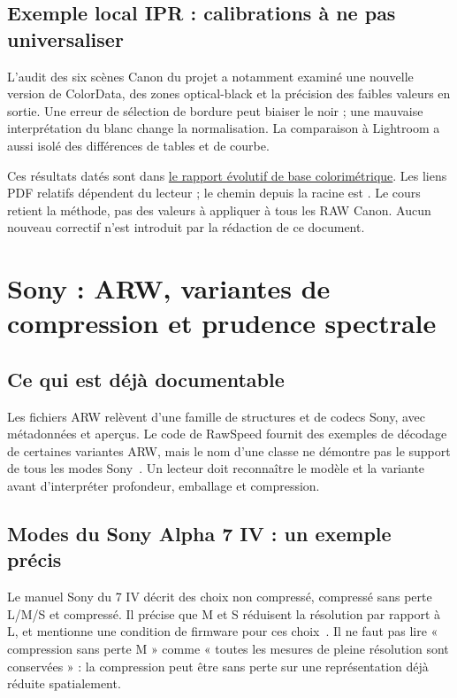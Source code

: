 \subsection{Exemple local IPR : calibrations à ne pas universaliser}
L'audit des six scènes Canon du projet a notamment
examiné une nouvelle version de ColorData, des zones
optical-black et la précision des faibles valeurs en
sortie. Une erreur de sélection de bordure peut biaiser
le noir ; une mauvaise interprétation du blanc change
la normalisation. La comparaison à Lightroom a aussi
isolé des différences de tables et de courbe.

Ces résultats datés sont dans
\href{../validation/analyses/analyse-base-colorimetrique.md}{le rapport évolutif de base colorimétrique}.
Les liens PDF relatifs dépendent du lecteur ; le chemin
depuis la racine est
.
Le cours retient la méthode, pas des valeurs à appliquer
à tous les RAW Canon. Aucun nouveau correctif n'est
introduit par la rédaction de ce document.

\section{Sony : ARW, variantes de compression et prudence spectrale}
\subsection{Ce qui est déjà documentable}
Les fichiers ARW relèvent d'une famille de structures
et de codecs Sony, avec métadonnées et aperçus.
Le code de RawSpeed fournit des exemples de décodage
de certaines variantes ARW, mais le nom d'une classe
ne démontre pas le support de tous les modes Sony~\cite{rawspeed,sonyarw2}.
Un lecteur doit reconnaître le modèle et la variante
avant d'interpréter profondeur, emballage et compression.

\subsection{Modes du Sony Alpha 7 IV : un exemple précis}
Le manuel Sony du 7 IV décrit des choix non compressé,
compressé sans perte L/M/S et compressé. Il précise que
M et S réduisent la résolution par rapport à L, et
mentionne une condition de firmware pour ces choix~\cite{sonymodes}.
Il ne faut pas lire « compression sans perte M » comme
« toutes les mesures de pleine résolution sont conservées » :
la compression peut être sans perte sur une représentation
déjà réduite spatialement.

